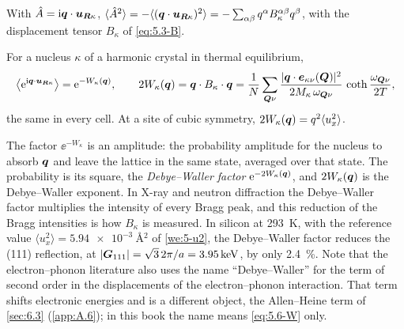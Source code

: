 With $\hat{A} = \mathrm{i}\bm{q}\cdot\bm{u}_{\bm{R}\kappa}$, $\langle\hat{A}^2\rangle = -\langle(\bm{q}\cdot\bm{u}_{\bm{R}\kappa})^2\rangle = -\sum_{\alpha\beta}q^\alpha B^{\alpha\beta}_\kappa q^\beta$, with the displacement tensor $B_\kappa$ of \cref{eq:5.3-B}.
\begin{keyresult}
For a nucleus $\kappa$ of a harmonic crystal in thermal equilibrium,
\begin{equation}
  \bigl\langle\mathrm{e}^{\mathrm{i}\bm{q}\cdot\bm{u}_{\bm{R}\kappa}}\bigr\rangle = \mathrm{e}^{-W_\kappa(\bm{q})} , \qquad
  2W_\kappa(\bm{q}) = \bm{q}\cdot B_\kappa\cdot\bm{q} = \frac1N\sum_{\bm{Q}\nu}\frac{|\bm{q}\cdot\bm{e}_{\kappa\nu}(\bm{Q})|^2}{2M_\kappa\,\omega_{\bm{Q}\nu}}\,\coth\frac{\omega_{\bm{Q}\nu}}{2T} ,
  \label{eq:5.6-W}
\end{equation}
the same in every cell. At a site of cubic symmetry, $2W_\kappa(\bm{q}) = q^2\langle u_x^2\rangle$.
\end{keyresult}
The factor $\ee^{-W_\kappa}$ is an amplitude: the probability amplitude for the nucleus to absorb $\bm{q}$ and leave the lattice in the same state, averaged over that state. The probability is its square, the \emph{Debye--Waller factor} $\mathrm{e}^{-2W_\kappa(\bm{q})}$, and $2W_\kappa(\bm{q})$ is the Debye--Waller exponent. In X-ray and neutron diffraction the Debye--Waller factor multiplies the intensity of every Bragg peak, and this reduction of the Bragg intensities is how $B_\kappa$ is measured. In silicon at \SI{293}{K}, with the reference value $\langle u_x^2\rangle = \SI{5.94e-3}{\angstrom^2}$ of \cref{we:5-u2}, the Debye--Waller factor reduces the (111) reflection, at $|\bm{G}_{111}| = \sqrt3\,2\pi/a = \SI{3.95}{keV}$, by only \SI{2.4}{\percent}. Note that the electron--phonon literature also uses the name ``Debye--Waller'' for the term of second order in the displacements of the electron--phonon interaction. That term shifts electronic energies and is a different object, the Allen--Heine term of \cref{sec:6.3} (\cref{app:A.6}); in this book the name means \cref{eq:5.6-W} only.

